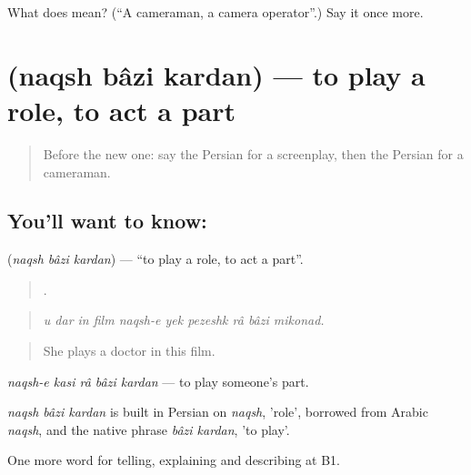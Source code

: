\begin{tcolorbox}[breakable,colback=teal!4,colframe=teal!35!black,title={Before you move on}]
What does  mean? (\textquotedblleft{}A cameraman, a camera operator\textquotedblright{}.) Say it once more.
\end{tcolorbox}
\section[\texorpdfstring{\fa{نقش} \fa{بازی} \fa{کردن} (naqsh bâzi kardan)}{نقش بازی کردن (naqsh bâzi kardan)}]{   (naqsh bâzi kardan) — to play a role, to act a part}

\label{lesson:FA-C524-naqsh-bazi-kardan}



\begin{quote}
Before the new one: say the Persian for a screenplay, then the Persian for a cameraman.
\end{quote}

\subsection*{You'll want to know:   }
\textbf{  } (\emph{naqsh bâzi kardan}) — \textquotedblleft{}to play a role, to act a part\textquotedblright{}.

\begin{quote}
         .
\end{quote}

\begin{quote}
\emph{u dar in film naqsh-e yek pezeshk râ bâzi mikonad.}
\end{quote}

\begin{quote}
She plays a doctor in this film.
\end{quote}

\emph{naqsh-e kasi râ bâzi kardan} — to play someone's part.

\begin{cousinweb}
\emph{naqsh bâzi kardan} is built in Persian on \emph{naqsh}, 'role', borrowed from Arabic \emph{naqsh}, and the native phrase \emph{bâzi kardan}, 'to play'.
\end{cousinweb}

\begin{grammarlens}[title={What you've built}]
One more word for telling, explaining and describing at B1.
\end{grammarlens}

